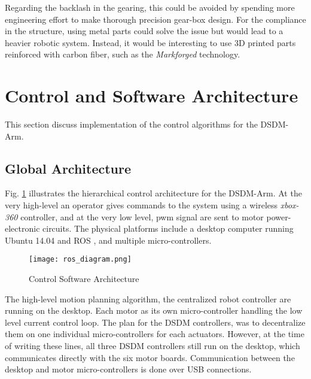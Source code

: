Regarding the backlash in the gearing, this could be avoided by spending more engineering effort to make thorough precision gear-box design. For the compliance in the structure, using metal parts could solve the issue but would lead to a heavier robotic system. Instead, it would be interesting to use 3D printed parts reinforced with carbon fiber, such as the \textit{Markforged} technology. 




\newpage
\newpage

\section{Control and Software Architecture}
\label{sec:ControlSoftwareArchitecture}

This section discuss implementation of the control algorithms for the DSDM-Arm. 

\subsection{Global Architecture}

Fig. \ref{fig:archi_diagram} illustrates the hierarchical control architecture for the DSDM-Arm. At the very high-level an operator gives commands to the system using a wireless \textit{xbox-360} controller, and at the very low level, pwm signal are sent to motor power-electronic circuits. The physical platforms include a desktop computer running Ubuntu 14.04 and ROS \cite{quigley_ros:_2009}, and multiple micro-controllers. 

\begin{figure}[H]
	\centering
		\texttt{[image: ros\_diagram.png]}
	\caption{Control Software Architecture}
	\label{fig:archi_diagram}
\end{figure}

The high-level motion planning algorithm, the centralized robot controller are running on the desktop. Each motor as its own micro-controller handling the low level current control loop. The plan for the DSDM controllers, was to decentralize them on one individual micro-controllers for each actuators. However, at the time of writing these lines, all three DSDM controllers still run on the desktop, which communicates directly with the six motor boards. Communication between the desktop and motor micro-controllers is done over USB connections.

